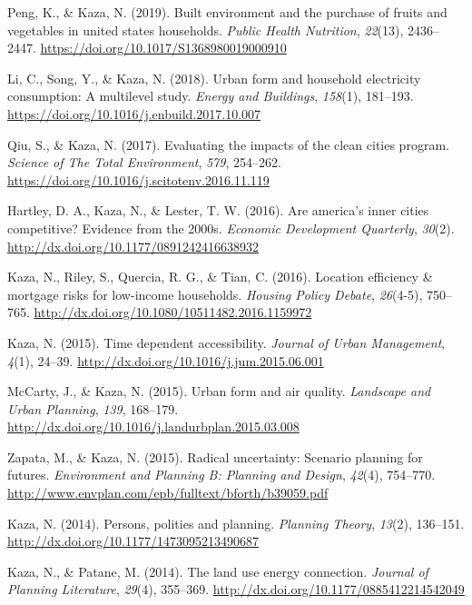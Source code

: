 \documentclass[11pt,a4paper,]{awesome-cv}
\newlength{\cslhangindent}
\newenvironment{CSLReferences}[2] %
 {\begin{list}{}{%
  \setlength{\itemindent}{0pt}
  \setlength{\leftmargin}{0pt}
  \setlength{\parsep}{0pt}
  \ifodd #1
   \setlength{\leftmargin}{\cslhangindent}
   \setlength{\itemindent}{-1\cslhangindent}
  \fi
  \setlength{\itemsep}{#2\baselineskip}}}
 {\end{list}}
\begin{document}
\begin{CSLReferences}{1}{0}
Peng, K., \& Kaza, N. (2019). Built environment and the purchase of
fruits and vegetables in united states households. \emph{Public Health
Nutrition}, \emph{22}(13), 2436--2447.
\url{https://doi.org/10.1017/S1368980019000910}

Li, C., Song, Y., \& Kaza, N. (2018). Urban form and household
electricity consumption: A multilevel study. \emph{Energy and
Buildings}, \emph{158}(1), 181--193.
\url{https://doi.org/10.1016/j.enbuild.2017.10.007}

Qiu, S., \& Kaza, N. (2017). Evaluating the impacts of the clean cities
program. \emph{Science of The Total Environment}, \emph{579}, 254--262.
\url{https://doi.org/10.1016/j.scitotenv.2016.11.119}

Hartley, D. A., Kaza, N., \& Lester, T. W. (2016). Are america's inner
cities competitive? Evidence from the 2000s. \emph{Economic Development
Quarterly}, \emph{30}(2).
\url{http://dx.doi.org/10.1177/0891242416638932}

Kaza, N., Riley, S., Quercia, R. G., \& Tian, C. (2016). Location
efficiency \& mortgage risks for low-income households. \emph{Housing
Policy Debate}, \emph{26}(4-5), 750--765.
\url{http://dx.doi.org/10.1080/10511482.2016.1159972}

Kaza, N. (2015). Time dependent accessibility. \emph{Journal of Urban
Management}, \emph{4}(1), 24--39.
\url{http://dx.doi.org/10.1016/j.jum.2015.06.001}

McCarty, J., \& Kaza, N. (2015). Urban form and air quality.
\emph{Landscape and Urban Planning}, \emph{139}, 168--179.
\url{http://dx.doi.org/10.1016/j.landurbplan.2015.03.008}

Zapata, M., \& Kaza, N. (2015). Radical uncertainty: Scenario planning
for futures. \emph{Environment and Planning B: Planning and Design},
\emph{42}(4), 754--770.
\url{http://www.envplan.com/epb/fulltext/bforth/b39059.pdf}

Kaza, N. (2014). Persons, polities and planning. \emph{Planning Theory},
\emph{13}(2), 136--151. \url{http://dx.doi.org/10.1177/1473095213490687}

Kaza, N., \& Patane, M. (2014). The land use energy connection.
\emph{Journal of Planning Literature}, \emph{29}(4), 355--369.
\url{http://dx.doi.org/10.1177/0885412214542049}


\end{CSLReferences}
\end{document}
